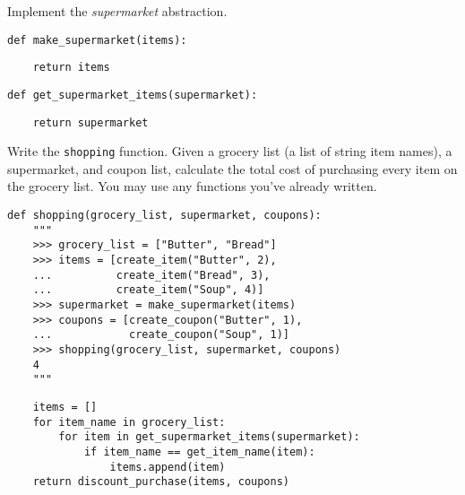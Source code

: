 \question Implement the \emph{supermarket} abstraction.

\begin{lstlisting}
def make_supermarket(items):
\end{lstlisting}
\begin{solution}[0.5in]
\begin{lstlisting}
    return items
\end{lstlisting}
\end{solution}

\begin{lstlisting}
def get_supermarket_items(supermarket):
\end{lstlisting}
\begin{solution}[0.5in]
\begin{lstlisting}
    return supermarket
\end{lstlisting}
\end{solution}

\clearpage

\question Write the {\tt shopping} function. Given a grocery list (a list of
string item names), a supermarket, and coupon list, calculate the total cost of
purchasing every item on the grocery list. You may use any functions you've
already written.

\begin{lstlisting}
def shopping(grocery_list, supermarket, coupons):
    """
    >>> grocery_list = ["Butter", "Bread"]
    >>> items = [create_item("Butter", 2),
    ...          create_item("Bread", 3),
    ...          create_item("Soup", 4)]
    >>> supermarket = make_supermarket(items)
    >>> coupons = [create_coupon("Butter", 1),
    ...            create_coupon("Soup", 1)]
    >>> shopping(grocery_list, supermarket, coupons)
    4
    """
\end{lstlisting}
\begin{solution}[3in]
\begin{lstlisting}
    items = []
    for item_name in grocery_list:
        for item in get_supermarket_items(supermarket):
            if item_name == get_item_name(item):
                items.append(item)
    return discount_purchase(items, coupons)
\end{lstlisting}
\end{solution}

